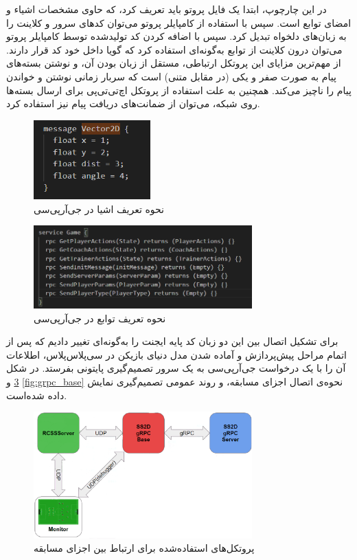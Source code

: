 در این چارچوپ، ابتدا یک فایل پروتو 
باید تعریف کرد، که حاوی مشخصات اشیاء و امضای توابع است. سپس با استفاده از کامپایلر پروتو می‌توان کد‌های سرور و کلاینت را به زبان‌های دلخواه تبدیل کرد.
سپس با اضافه کردن کد تولید‌شده توسط کامپایلر پروتو می‌توان درون کلاینت از توابع به‌گونه‌ای استفاده کرد که گویا داخل خود کد قرار دارند. از مهم‌ترین مزایای
این پروتکل ارتباطی، مستقل از زبان بودن آن، و نوشتن بسته‌های پیام به صورت صفر و یکی (در مقابل متنی)  است که سربار زمانی نوشتن و خواندن پیام را ناچیز می‌کند.
همچنین به علت استفاده از پروتکل اچ‌تی‌تی‌پی برای ارسال بسته‌ها روی شبکه، 
می‌توان از ضمانت‌های دریافت پیام نیز استفاده کرد.
\begin{figure}[H]
    \centering
    \includegraphics[width=0.4\textwidth]{images/grpc_message.png}
    \caption{نحوه تعریف اشیا در جی‌آر‌پی‌سی}\label{fig:grpc_message}
\end{figure}
\begin{figure}[H]
    \centering
    \includegraphics[width=0.75\textwidth]{images/grpc_service.png}
    \caption{نحوه تعریف توابع در جی‌آر‌پی‌سی}\label{fig:grpc_service}
\end{figure}

برای تشکیل اتصال بین این دو زبان کد پایه ایجنت را به‌گونه‌ای تغییر دادیم که
پس از اتمام مراحل پیش‌پردازش و آماده شدن مدل دنیای بازیکن
در سی‌پلاس‌پلاس،
اطلاعات آن را با یک درخواست جی‌آرپی‌سی
به یک سرور تصمیم‌گیری پایتونی بفرستد.
در شکل \ref{fig:connection} و \ref{fig:grpc_base}
نحوه‌ی اتصال اجزای مسابقه، و روند عمومی تصمیم‌گیری نمایش داده شده‌است.

\begin{figure}[H]
    \centering
    \includegraphics[width=0.75\textwidth]{images/connection_protocols.png}
    \caption{پروتکل‌های استفاده‌شده برای ارتباط بین اجزای مسابقه}\label{fig:connection}
    
\end{figure}

